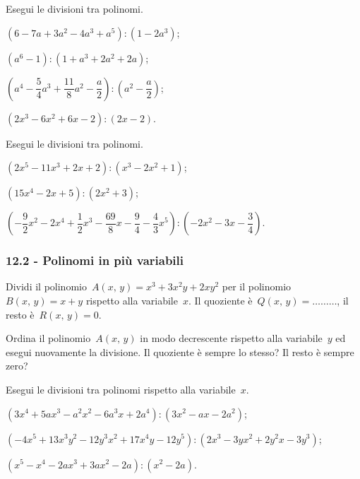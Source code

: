 \begin{esercizio}[\Ast]
\label{ese:12.4}
Esegui le divisioni tra polinomi.
 \begin{enumeratea}
 \item $\left(6-7a+3a^{2}-4a^{3}+a^{5}\right):\left(1-2a^{3}\right)$;
 \item $(a^{6}-1):(1+a^{3}+2a^{2}+2a)$;
 \item $\left(a^{4}-\dfrac{5}{4}a^{3}+\dfrac{11}{8}a^{2}-\dfrac{a}{2}\right):\left(a^{2}-\dfrac{a}{2}\right)$;
 \item $\left(2x^{3}-6x^{2}+6x-2\right):\left(2x-2\right)$.
 \end{enumeratea}
\end{esercizio}

\begin{esercizio}
\label{ese:12.5}
Esegui le divisioni tra polinomi.
 \begin{enumeratea}
 \item $\left(2x^{5}-11x^{3}+2x+2\right):\left(x^{3}-2x^{2}+1\right)$;
 \item $\left(15x^{4}-2x+5\right):\left(2x^{2}+3\right)$;
 \item $\left(-{\dfrac{9}{2}}x^{2}-2x^{4}+\dfrac{1}{2}x^{3}-\dfrac{69}{8}x-\dfrac{9}{4}-\dfrac{4}{3}x^{5}\right):\left(-2x^{2}-3x-\dfrac{3}{4}\right)$.
 \end{enumeratea}
\end{esercizio}

\subsubsection*{12.2 - Polinomi in più variabili}

\begin{esercizio}
\label{ese:12.6}
Dividi il polinomio~$A(x\text{,~}y)=x^{3}+3x^{2}y+2xy^{2}$ per il polinomio~$B(x\text{,~}y)=x+y$ rispetto alla variabile~$x$.
Il quoziente è~$Q(x\text{,~}y)=\ldots \ldots \ldots$, il resto è~$R(x\text{,~}y)=0$.

Ordina il polinomio~$A(x\text{,~}y)$ in modo decrescente rispetto alla variabile~$y$ ed esegui
nuovamente la divisione. Il quoziente è sempre lo stesso? Il resto è sempre zero?
\end{esercizio}

\begin{esercizio}
\label{ese:12.7}
Esegui le divisioni tra polinomi rispetto alla variabile~$x$.
 \begin{enumeratea}
 \item $\left(3x^{4}+5ax^{3}-a^{2}x^{2}-6a^{3}x+2a^{4}\right):\left(3x^{2}-ax-2a^{2}\right)$;
 \item $\left(-4x^{5}+13x^{3}y^{2}-12y^{3}x^{2}+17x^{4}y-12y^{5}\right):\left(2x^{3}-3yx^{2}+2y^{2}x-3y^{3}\right)$;
 \item $\left(x^{5}-x^{4}-2ax^{3}+3ax^{2}-2a\right):\left(x^{2}-2a\right)$.
 \end{enumeratea}
\end{esercizio}

